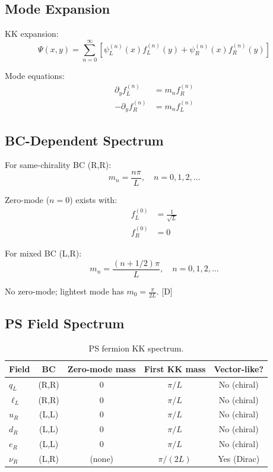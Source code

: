 \documentclass[11pt,a4paper]{article}
\newcommand{\tagD}{\textcolor{blue!70!black}{[D]}}
\begin{document}
\subsection{Mode Expansion}

KK expansion:
\begin{equation}
\label{eq:kk-expansion}
\Psi(x, y) = \sum_{n=0}^\infty \left[\psi_L^{(n)}(x) f_L^{(n)}(y) + \psi_R^{(n)}(x) f_R^{(n)}(y)\right]
\end{equation}

Mode equations:
\begin{align}
\label{eq:mode-eq-1}
\partial_y f_L^{(n)} &= m_n f_R^{(n)} \\
\label{eq:mode-eq-2}
-\partial_y f_R^{(n)} &= m_n f_L^{(n)}
\end{align}

\subsection{BC-Dependent Spectrum}

For same-chirality BC (R,R):
\begin{equation}
\label{eq:spec-RR}
m_n = \frac{n\pi}{L}, \quad n = 0, 1, 2, \ldots
\end{equation}

Zero-mode ($n=0$) exists with:
\begin{align}
\label{eq:zero-mode-fL}
f_L^{(0)} &= \frac{1}{\sqrt{L}} \\
\label{eq:zero-mode-fR}
f_R^{(0)} &= 0
\end{align}

For mixed BC (L,R):
\begin{equation}
\label{eq:spec-LR}
m_n = \frac{(n + 1/2)\pi}{L}, \quad n = 0, 1, 2, \ldots
\end{equation}

No zero-mode; lightest mode has $m_0 = \frac{\pi}{2L}$.
\tagD

\subsection{PS Field Spectrum}

\begin{table}[h]
\centering
\caption{PS fermion KK spectrum.}
\label{tab:ps-kk}
\begin{tabular}{lcccc}
\toprule
Field & BC & Zero-mode mass & First KK mass & Vector-like? \\
\midrule
$q_L$ & (R,R) & 0 & $\pi/L$ & No (chiral) \\
$\ell_L$ & (R,R) & 0 & $\pi/L$ & No (chiral) \\
$u_R$ & (L,L) & 0 & $\pi/L$ & No (chiral) \\
$d_R$ & (L,L) & 0 & $\pi/L$ & No (chiral) \\
$e_R$ & (L,L) & 0 & $\pi/L$ & No (chiral) \\
$\nu_R$ & (L,R) & (none) & $\pi/(2L)$ & Yes (Dirac) \\
\bottomrule
\end{tabular}
\end{table}
\end{document}
